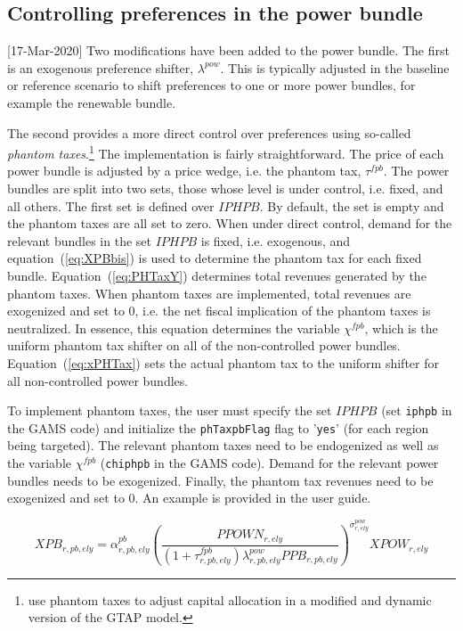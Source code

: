 \documentclass[11pt,letterpaper]{report}
\begin{document}
\subsection{Controlling preferences in the power bundle}

[17-Mar-2020] Two modifications have been added to the power bundle.
The first is an exogenous preference shifter, $\lambda^{\mathit{pow}}$. This is typically
adjusted in the baseline or reference scenario to shift preferences
to one or more power bundles, for example the renewable bundle.

The second provides a more direct control over preferences using
so-called \emph{phantom taxes}.\footnote{\cite{DixonetalGEA2019} use
phantom taxes to adjust capital allocation in a modified and dynamic
version of the GTAP model.}
The implementation is fairly straightforward. The price of
each power bundle is adjusted by a price wedge, i.e. the
phantom tax, $\tau^{\mathit{fpb}}$. The power bundles are
split into two sets, those whose level is under control, i.e. fixed,
and all others. The first set is defined over $\mathit{IPHPB}$.
By default, the set is empty and the phantom taxes are all set
to zero. When under direct control, demand for the relevant bundles in
the set $\mathit{IPHPB}$ is fixed, i.e. exogenous, and
equation~(\ref{eq:XPBbis}) is used to determine the phantom tax
for each fixed bundle. Equation~(\ref{eq:PHTaxY}) determines total
revenues generated by the phantom taxes. When phantom taxes
are implemented, total revenues are exogenized and set to 0, i.e.
the net fiscal implication of the phantom taxes is neutralized. In
essence, this equation determines the variable $\chi^{\mathit{fpb}}$, which
is the uniform phantom tax shifter on all of the non-controlled
power bundles. Equation~(\ref{eq:xPHTax}) sets the actual
phantom tax to the uniform shifter for all non-controlled power bundles.

To implement phantom taxes, the user must specify the set $\mathit{IPHPB}$
(set \texttt{iphpb} in the GAMS code) and initialize the
\texttt{phTaxpbFlag} flag to '\texttt{yes}' (for each region being targeted). The relevant phantom taxes need to be endogenized as well
as the variable $\chi^{\mathit{fpb}}$ (\texttt{chiphpb} in the GAMS code).
Demand for the relevant power bundles needs to be exogenized. Finally,
the phantom tax revenues need to be exogenized and set to 0. An example is
provided in the user guide.

\begin{equation}
\label{eq:XPBbis}
\mathit{XPB}_{r,\mathit{pb},\mathit{ely}} = \alpha^{\mathit{pb}}_{r,\mathit{pb},\mathit{ely}}
\left(
\frac {\mathit{PPOWN}_{r,\mathit{ely}}} {\left(1+\tau^{\mathit{fpb}}_{r,\mathit{pb},\mathit{ely}}\right)\lambda^{\mathit{pow}}_{r,\mathit{pb},\mathit{ely}}\mathit{PPB}_{r,\mathit{pb},\mathit{ely}}}
\right)^{\sigma^{\mathit{pow}}_{r,\mathit{ely}}}
\mathit{XPOW}_{r,\mathit{ely}}
\end{equation}
\end{document}
